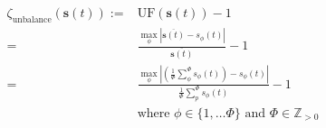 \begin{equation}
	\begin{split}
		\zeta_\text{unbalance}(\textbf{s}(t)):=&\text{UF}(\textbf{s}(t)) - 1 \\
		=&\frac{\max_\phi\left|\overline{\textbf{s}(t)} - s_\phi(t)\right|}{\overline{\textbf{s}(t)}} - 1 \\
		=&\frac{\max_\phi\left|\left(\frac{1}{\Phi}\sum_\phi^\Phi{s_\phi(t)}\right) - s_\phi(t)\right|}{\frac{1}{\Phi}\sum_p^\Phi{s_\phi(t)}} - 1 \\
		&\text{where } \phi \in \{1, \dots \Phi\} \text{ and } \Phi \in \mathbb{Z}_{>0}
	\end{split}
	\label{ch1:equ:unbalance-cost}
\end{equation}
